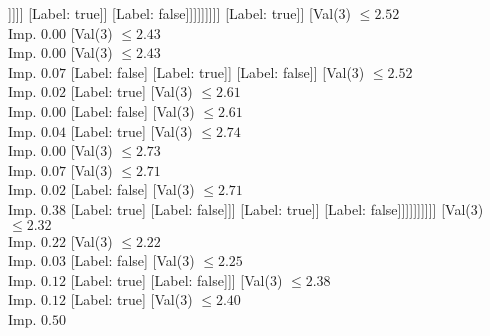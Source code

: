 \documentclass[margin=10pt]{standalone}
\begin{document}
\begin{forest}
																					[Val($3$) $ \leq 2.39$ \\ Imp. $0.05$
																						[Val($3$) $ \leq 2.37$ \\ Imp. $0.00$
																							[Label: false]
																							[Val($3$) $ \leq 2.37$ \\ Imp. $0.07$
																								[Label: true]
																								[Val($3$) $ \leq 2.38$ \\ Imp. $0.00$
																									[Label: false]
																									[Val($3$) $ \leq 2.38$ \\ Imp. $0.17$
																										[Label: true]
																										[Label: false]]]]]
																						[Label: true]]
																					[Label: false]]]]]]]]]
													[Label: true]]
												[Val($3$) $ \leq 2.52$ \\ Imp. $0.00$
													[Val($3$) $ \leq 2.43$ \\ Imp. $0.00$
														[Val($3$) $ \leq 2.43$ \\ Imp. $0.07$
															[Label: false]
															[Label: true]]
														[Label: false]]
													[Val($3$) $ \leq 2.52$ \\ Imp. $0.02$
														[Label: true]
														[Val($3$) $ \leq 2.61$ \\ Imp. $0.00$
															[Label: false]
															[Val($3$) $ \leq 2.61$ \\ Imp. $0.04$
																[Label: true]
																[Val($3$) $ \leq 2.74$ \\ Imp. $0.00$
																	[Val($3$) $ \leq 2.73$ \\ Imp. $0.07$
																		[Val($3$) $ \leq 2.71$ \\ Imp. $0.02$
																			[Label: false]
																			[Val($3$) $ \leq 2.71$ \\ Imp. $0.38$
																				[Label: true]
																				[Label: false]]]
																		[Label: true]]
																	[Label: false]]]]]]]]]]
								[Val($3$) $ \leq 2.32$ \\ Imp. $0.22$
									[Val($3$) $ \leq 2.22$ \\ Imp. $0.03$
										[Label: false]
										[Val($3$) $ \leq 2.25$ \\ Imp. $0.12$
											[Label: true]
											[Label: false]]]
									[Val($3$) $ \leq 2.38$ \\ Imp. $0.12$
										[Label: true]
										[Val($3$) $ \leq 2.40$ \\ Imp. $0.50$

\end{forest}
\end{document}
